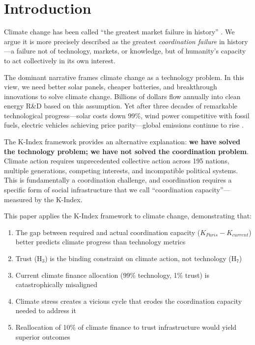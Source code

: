 \documentclass[12pt,a4paper]{article}
\begin{document}
\section{Introduction}
\label{sec:intro}

Climate change has been called ``the greatest market failure in history'' \citep{stern2007economics}. We argue it is more precisely described as the greatest \textit{coordination failure} in history---a failure not of technology, markets, or knowledge, but of humanity's capacity to act collectively in its own interest.

The dominant narrative frames climate change as a technology problem. In this view, we need better solar panels, cheaper batteries, and breakthrough innovations to solve climate change. Billions of dollars flow annually into clean energy R\&D based on this assumption. Yet after three decades of remarkable technological progress---solar costs down 99\%, wind power competitive with fossil fuels, electric vehicles achieving price parity---global emissions continue to rise \citep{IEA2024}.

The K-Index framework \citep{Paper1, Paper2, Paper3, Paper4} provides an alternative explanation: \textbf{we have solved the technology problem; we have not solved the coordination problem}. Climate action requires unprecedented collective action across 195 nations, multiple generations, competing interests, and incompatible political systems. This is fundamentally a coordination challenge, and coordination requires a specific form of social infrastructure that we call ``coordination capacity''---measured by the K-Index.

This paper applies the K-Index framework to climate change, demonstrating that:

\begin{enumerate}
    \item The gap between required and actual coordination capacity ($K_{Paris} - K_{current}$) better predicts climate progress than technology metrics
    \item Trust (H$_3$) is the binding constraint on climate action, not technology (H$_7$)
    \item Current climate finance allocation (99\% technology, 1\% trust) is catastrophically misaligned
    \item Climate stress creates a vicious cycle that erodes the coordination capacity needed to address it
    \item Reallocation of 10\% of climate finance to trust infrastructure would yield superior outcomes
\end{enumerate}
\end{document}
